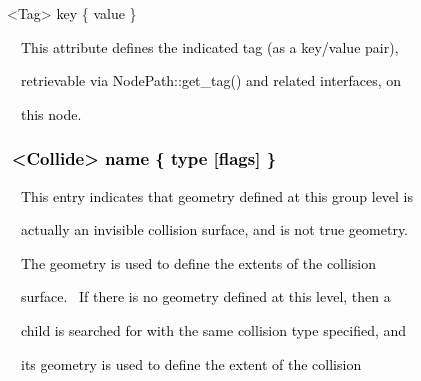 \documentclass[a4paper]{article}
\newcommand\textstyleOOoComputerKeyWord[1]{\textrm{\textcolor[rgb]{0.0,0.0,0.5019608}{#1}}}
\newcommand\textstyleOOoAssemblerSpecialChar[1]{\textrm{\textcolor[rgb]{0.0,0.5019608,0.0}{#1}}}
\newcommand\textstyleOOoAssemblerIdent[1]{\textrm{\textcolor{black}{#1}}}
\begin{document}
{\color{black}
\textstyleOOoComputerKeyWord{\textcolor{black}{\ \ }}\textstyleOOoAssemblerSpecialChar{{\textless}}\textstyleOOoAssemblerIdent{Tag}\textstyleOOoAssemblerSpecialChar{{\textgreater}}\textstyleOOoComputerKeyWord{\textcolor{black}{
}}\textstyleOOoAssemblerIdent{key}\textstyleOOoComputerKeyWord{\textcolor{black}{
}}\textstyleOOoAssemblerSpecialChar{\{}\textstyleOOoComputerKeyWord{\textcolor{black}{
}}\textstyleOOoAssemblerIdent{value}\textstyleOOoComputerKeyWord{\textcolor{black}{
}}\textstyleOOoAssemblerSpecialChar{\}}}


\bigskip

{\color{black}
\textstyleOOoComputerKeyWord{\textcolor{black}{\ \ \ \ This attribute defines the indicated tag (as a key/value
pair),}}}

{\color{black}
\textstyleOOoComputerKeyWord{\textcolor{black}{\ \ \ \ retrievable via NodePath::get\_tag() and related interfaces,
on}}}

{\color{black}
\textstyleOOoComputerKeyWord{\textcolor{black}{\ \ \ \ this node.}}}


\bigskip


\bigskip

\subsubsection[\ \ {\textless}Collide{\textgreater} name \{ type [flags{]}
\}]{\textstyleOOoComputerKeyWord{\textcolor{black}{\ \ {\textless}Collide{\textgreater} name \{ type [flags] \}}}}
\hypertarget{RefHeading7692869075401}{}
\bigskip

{\color{black}
\textstyleOOoComputerKeyWord{\textcolor{black}{\ \ \ \ This entry indicates that geometry defined at this group level
is}}}

{\color{black}
\textstyleOOoComputerKeyWord{\textcolor{black}{\ \ \ \ actually an invisible collision surface, and is not true
geometry.}}}

{\color{black}
\textstyleOOoComputerKeyWord{\textcolor{black}{\ \ \ \ The geometry is used to define the extents of the collision}}}

{\color{black}
\textstyleOOoComputerKeyWord{\textcolor{black}{\ \ \ \ surface. \ If there is no geometry defined at this level, then
a}}}

{\color{black}
\textstyleOOoComputerKeyWord{\textcolor{black}{\ \ \ \ child is searched for with the same collision type specified,
and}}}

{\color{black}
\textstyleOOoComputerKeyWord{\textcolor{black}{\ \ \ \ its geometry is used to define the extent of the collision}}}
\end{document}
